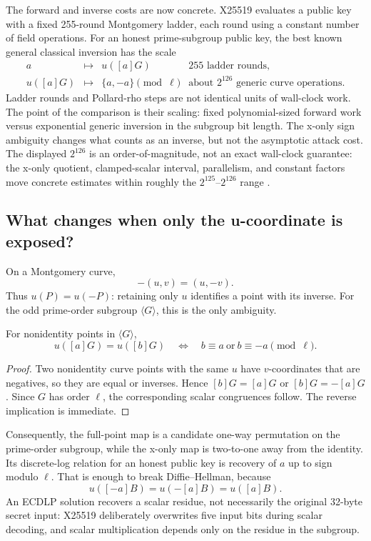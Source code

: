 The forward and inverse costs are now concrete. X25519 evaluates a public key
with a fixed 255-round Montgomery ladder, each round using a constant number of
field operations. For an honest prime-subgroup public key, the best known
general classical inversion has the scale
\[
\begin{array}{rcll}
  a &\longmapsto& u([a]G) & 255\text{ ladder rounds},\\[0.2em]
  u([a]G) &\longmapsto& \{a,-a\}\pmod\ell
    & \text{about }2^{126}\text{ generic curve operations}.
\end{array}
\]
Ladder rounds and Pollard-rho steps are not identical units of wall-clock
work. The point of the comparison is their scaling: fixed polynomial-sized
forward work versus exponential generic inversion in the subgroup bit length.
The x-only sign ambiguity changes what counts as an inverse, but not the
asymptotic attack cost. The displayed $2^{126}$ is an order-of-magnitude, not
an exact wall-clock guarantee: the x-only quotient, clamped-scalar interval,
parallelism, and constant factors move concrete estimates within roughly the
$2^{125}$--$2^{126}$ range \cite{bernstein2006curve25519}.

\subsection{What changes when only the u-coordinate is exposed?}

On a Montgomery curve,
\[
  -(u,v)=(u,-v).
\]
Thus $u(P)=u(-P)$: retaining only $u$ identifies a point with its inverse. For
the odd prime-order subgroup $\langle G\rangle$, this is the only ambiguity.

\begin{proposition}
For nonidentity points in $\langle G\rangle$,
\[
  u([a]G)=u([b]G)
  \quad\Longleftrightarrow\quad
  b\equiv a\ \text{or}\ b\equiv-a\pmod\ell.
\]
\end{proposition}

\begin{proof}
Two nonidentity curve points with the same $u$ have $v$-coordinates that are
negatives, so they are equal or inverses. Hence $[b]G=[a]G$ or
$[b]G=-[a]G$. Since $G$ has order $\ell$, the corresponding scalar
congruences follow. The reverse implication is immediate.
\end{proof}

Consequently, the full-point map is a candidate one-way permutation on the
prime-order subgroup, while the x-only map is two-to-one away from the
identity. Its discrete-log relation for an honest public key is recovery of
$a$ up to sign modulo $\ell$. That is enough to break
Diffie--Hellman, because
\[
  u([-a]B)=u(-[a]B)=u([a]B).
\]
An ECDLP solution recovers a scalar residue, not necessarily the original
32-byte secret input: X25519 deliberately overwrites five input bits during
scalar decoding, and scalar multiplication depends only on the residue in the
subgroup.

